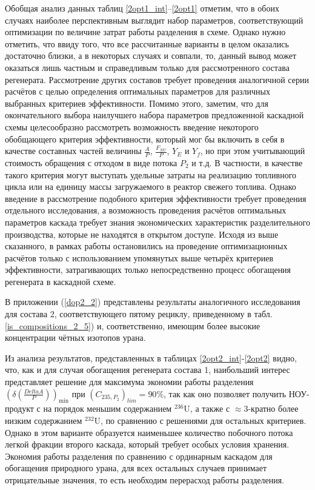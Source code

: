 {Обобщая анализ данных таблиц \ref{2opt1_int}--\ref{2opt1} отметим, что в обоих случаях наиболее перспективным выглядит набор параметров, соответствующий оптимизации по величине затрат работы разделения в схеме. Однако нужно отметить, что ввиду того, что все рассчитанные варианты в целом оказались достаточно близки, а в некоторых случаях и совпали, то, данный вывод может оказаться лишь частным и справедливым только для рассмотренного состава регенерата. Рассмотрение других составов требует проведения аналогичной серии расчётов с целью определения оптимальных параметров для различных выбранных критериев эффективности. Помимо этого, заметим, что для окончательного выбора наилучшего набора параметров предложенной каскадной схемы целесообразно рассмотреть возможность введение некоторого обобщающего критерия эффективности, который мог бы включить в себя в качестве составных частей величины $\frac{A}{P}$, $\frac{F_{NU}}{P}$, $Y_E$ и $Y_f$, но при этом учитывающий стоимость обращения с отходом в виде потока $P_2$ и т.д. В частности, в качестве такого критерия могут выступать удельные затраты на реализацию топливного цикла или на единицу массы загружаемого в реактор свежего топлива. Однако введение в рассмотрение подобного критерия эффективности требует проведения отдельного исследования, а возможность проведения расчётов оптимальных параметров каскада требует знания экономических характеристик разделительного производства, которые не находятся в открытом доступе. Исходя из выше сказанного, в рамках работы остановились на проведение оптимизационных расчётов только с использованием упомянутых выше четырёх критериев эффективности, затрагивающих только непосредственно процесс обогащения регенерата в каскадной схеме.

В приложении (\ref{dop2_2}) представлены результаты аналогичного исследования для состава 2, соответствующего пятому рециклу, приведенному в табл. \ref{is_compositions_2_5}) и, соответственно, имеющим более высокие концентрации чётных изотопов урана.


Из анализа результатов, представленных в таблицах \ref{2opt2_int}-\ref{2opt2} видно, что, как и для случая обогащения регенерата состава 1, наибольший интерес представляет решение для максимума экономии работы разделения $(\delta(\frac{Delta A}{P}))_\text{min}$ при $({C_{235,{P_2}}})_{lim}=90\%$, так как оно позволяет получить НОУ-продукт с на порядок меньшим содержанием $^{236}$U, а также с $\approx$3-кратно более низким содержанием $^{232}$U, по сравнению с решениями для остальных критериев. Однако в этом варианте образуется наименьшее количество побочного потока легкой фракции второго каскада, который требует особых условия хранения. 
Экономия работы разделения по сравнению с ординарным каскадом для обогащения природного урана, для всех остальных случаев принимает отрицательные значения, то есть необходим перерасход работы разделения.

}
